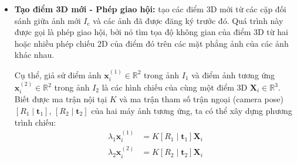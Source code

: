\begin{itemize}
    Để thực hiện điều này, đầu tiên ta tìm kiếm các cặp đối sánh đặc trưng giữa ảnh mới \( I_{\text{c}} \) và các ảnh đã được đăng ký, từ đó ánh xạ đến các điểm 3D đã biết trong mô hình. Kết quả thu được là một tập hợp các cặp tương ứng 2D-3D \( \{ (\mathbf{x}_i, \mathbf{X}_i) \} \), trong đó \( \mathbf{x}_i \in \mathbb{R}^2 \) là vị trí điểm ảnh trong \( I_{\text{c}} \), và \( \mathbf{X}_i \in \mathbb{R}^3 \) là điểm 3D tương ứng đã biết.
    
    Với các cặp tương ứng này, bài toán trở thành một trường hợp cổ điển của bài toán \textit{Perspective-$n$-Point (PnP)}, trong đó ta tìm ma trận \( [R \mid \mathbf{t}] \) sao cho:
    
    \begin{equation}
        \mathbf{x}_i \sim \pi\left( K [R \mid \mathbf{t}] \mathbf{X}_i \right)     
    \end{equation}
    
    trong đó \( K \in \mathbb{R}^{3 \times 3} \) là ma trận thông số nội tại của máy ảnh, và \( \pi(\cdot) \) là phép chiếu từ không gian 3D về mặt phẳng ảnh 2D theo mô hình pinhole.
    
    Để tăng độ bền vững trước nhiễu và các đối sánh sai lệch, việc giải bài toán PnP thường đi kèm với thuật toán \textit{RANSAC}, nhằm loại bỏ các ngoại lai và chỉ giữ lại các cặp đối sánh hình học nhất quán. Khi camera pose ảnh được xác định chính xác, ảnh \( I_{\text{c}} \) sẽ được thêm vào mô hình, trở thành một ảnh đã đăng ký.
    
    \item \textbf{Tạo điểm 3D mới - Phép giao hội:} tạo các điểm 3D mới từ các cặp đối sánh giữa ảnh mới \( I_{\text{c}} \) và các ảnh đã được đăng ký trước đó. Quá trình này được gọi là phép giao hội, bởi nó tìm tọa độ không gian của điểm 3D từ hai hoặc nhiều phép chiếu 2D của điểm đó trên các mặt phẳng ảnh của các ảnh khác nhau.

    Cụ thể, giả sử điểm ảnh \( \mathbf{x}_i^{(1)} \in \mathbb{R}^2 \) trong ảnh \( I_1 \) và điểm ảnh tương ứng \( \mathbf{x}_i^{(2)} \in \mathbb{R}^2 \) trong ảnh \( I_2 \) là các hình chiếu của cùng một điểm 3D \( \mathbf{X}_i \in \mathbb{R}^3 \). Biết được ma trận nội tại \( K \) và ma trận tham số trận ngoại (camera pose) \( [R_1\mid\mathbf{t}_1] \), \( [R_2\mid\mathbf{t}_2] \) của hai máy ảnh tương ứng, ta có thể xây dựng phương trình chiếu:
    \begin{align}
        \lambda_1 \mathbf{x}_i^{(1)} &= K \left[ R_1 \mid \mathbf{t}_1 \right] \mathbf{X}_i \\
        \lambda_2 \mathbf{x}_i^{(2)} &= K \left[ R_2 \mid \mathbf{t}_2 \right] \mathbf{X}_i
    \end{align}
    

\end{itemize}
